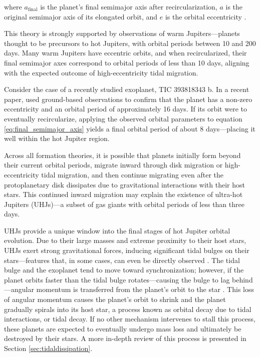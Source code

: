 \documentclass[oneside,12pt]{amsart}
\numberwithin{page}{section}
\begin{document}
where $a_{\text{final}}$ is the planet’s final semimajor axis after recircularization, $a$ is the original semimajor axis of its elongated orbit, and $e$ is the orbital eccentricity \citep{dawson2018origins}.

This theory is strongly supported by observations of warm Jupiters—planets thought to be precursors to hot Jupiters, with orbital periods between 10 and 200 days. Many warm Jupiters have eccentric orbits, and when recircularized, their final semimajor axes correspond to orbital periods of less than 10 days, aligning with the expected outcome of high-eccentricity tidal migration.

Consider the case of a recently studied exoplanet, TIC 393818343 b. In a recent paper, \citet{sgro2024confirmation} used ground-based observations to confirm that the planet has a non-zero eccentricity and an orbital period of approximately 16 days. If its orbit were to eventually recircularize, applying the observed orbital parameters to equation \ref{eq:final_semimajor_axis} yields a final orbital period of about 8 days—placing it well within the hot Jupiter region.

Across all formation theories, it is possible that planets initially form beyond their current orbital periods, migrate inward through disk migration or high-eccentricity tidal migration, and then continue migrating even after the protoplanetary disk dissipates due to gravitational interactions with their host stars. This continued inward migration may explain the existence of ultra-hot Jupiters (UHJs)—a subset of gas giants with orbital periods of less than three days.

UHJs provide a unique window into the final stages of hot Jupiter orbital evolution. Due to their large masses and extreme proximity to their host stars, UHJs exert strong gravitational forces, inducing significant tidal bulges on their stars—features that, in some cases, can even be directly observed \citep{barros2022detection}. The tidal bulge and the exoplanet tend to move toward synchronization; however, if the planet orbits faster than the tidal bulge rotates—causing the bulge to lag behind—angular momentum is transferred from the planet’s orbit to the star \citep{ogilvie2014tidal}. This loss of angular momentum causes the planet's orbit to shrink and the planet gradually spirals into its host star, a process known as orbital decay due to tidal interactions, or tidal decay. If no other mechanism intervenes to stall this process, these planets are expected to eventually undergo mass loss and ultimately be destroyed by their stars. A more in-depth review of this process is presented in Section \ref{sec:tidaldissipation}.
\end{document}
